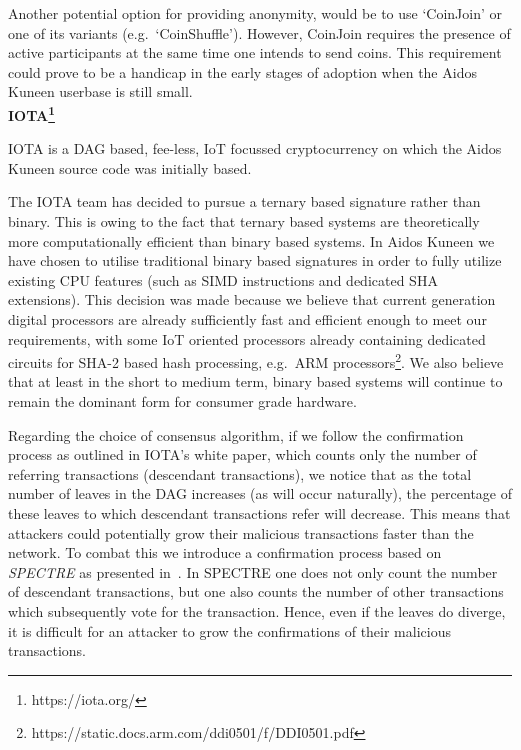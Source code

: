 \documentclass[a4paper,10pt,twocolumn]{article}
\begin{document}
	Another potential option for providing anonymity, would be to use `CoinJoin' or one of its variants (e.g.\ `CoinShuffle'). However, 
	CoinJoin requires the presence of active participants at the same time one intends to send coins. This requirement could prove to be a 
	handicap in the early stages of adoption when the Aidos Kuneen userbase is still small. 
	\\
	
	\noindent
	{\bf IOTA\footnote{https://iota.org/}}
	
	IOTA is a DAG based, fee-less, IoT focussed cryptocurrency on which the Aidos Kuneen source code was initially based.
	
	The IOTA team has decided to pursue a ternary based signature rather than binary. This is owing to the fact that ternary based 
	systems are theoretically more computationally efficient than binary based systems. In Aidos Kuneen we have chosen to utilise 
	traditional binary based signatures in order to fully utilize existing CPU features (such as SIMD instructions and dedicated SHA 
	extensions). This decision was made because we believe that current generation digital processors are already sufficiently fast and 
	efficient enough to meet our requirements, with some IoT oriented processors already containing dedicated circuits for 
	SHA-2 based hash processing, e.g.~ARM processors\footnote{https://static.docs.arm.com/ddi0501/f/DDI0501.pdf}. We also believe that at 
	least in the short to medium term, binary based systems will continue to remain the dominant form for consumer grade hardware.
	
	\vspace{2.5mm}
	
	Regarding the choice of consensus algorithm, if we follow the confirmation process as outlined in IOTA's white paper, which counts only the number of referring transactions 
	(descendant transactions), we notice that as the total number of leaves in the DAG increases (as will occur naturally), 
	the percentage of these leaves to which descendant transactions refer will decrease.
	This means that attackers could potentially grow their malicious
	transactions faster than the network. To combat this we introduce a confirmation process based on \emph{SPECTRE} as presented 
	in~\cite{spectre}. In SPECTRE one does not only count the number of descendant transactions, but one also counts the number of other 
	transactions which subsequently vote for the transaction. Hence, even if the leaves do diverge, it is difficult for an attacker to grow 
	the confirmations of their malicious transactions.
	
\end{document}
